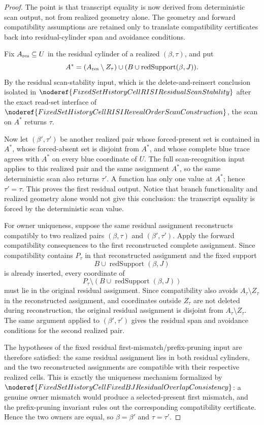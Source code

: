 \begin{proof}
The point is that transcript equality is now derived from deterministic scan
output, not from realized geometry alone.  The geometry and forward
compatibility assumptions are retained only to translate compatibility
certificates back into residual-cylinder span and avoidance conditions.

Fix \(A_{\rm res}\subseteq U\) in the residual cylinder of a realized
\((\beta,\tau)\), and put
\[
A^\ast=(A_{\rm res}\setminus Z_\tau)\cup
  (B\cup\operatorname{redSupport}(\beta,J)).
\]
By the residual scan-stability input, which is the delete-and-reinsert
conclusion isolated in
\(\noderef{FixedSetHistoryCellRISIResidualScanStability}\) after the exact
read-set interface of
\(\noderef{FixedSetHistoryCellRISIRevealOrderScanConstruction}\), the scan
on \(A^\ast\) returns \(\tau\).

Now let \((\beta',\tau')\) be another realized pair whose forced-present
set is contained in \(A^\ast\), whose forced-absent set is disjoint from
\(A^\ast\), and whose complete blue trace agrees with \(A^\ast\) on every
blue coordinate of \(U\).  The full scan-recognition input applies to this
realized pair and the same assignment \(A^\ast\), so the same deterministic
scan also returns \(\tau'\).  A function has only one value at \(A^\ast\); hence
\(\tau'=\tau\).  This proves the first residual output.  Notice that branch
functionality and realized geometry alone would not give this conclusion:
the transcript equality is forced by the deterministic scan value.

For owner uniqueness, suppose the same residual assignment reconstructs
compatibly to two realized pairs \((\beta,\tau)\) and
\((\beta',\tau')\).  Apply the forward compatibility consequences to the
first reconstructed complete assignment.  Since compatibility contains
\(P_\tau\) in that reconstructed assignment and the fixed support
\[
B\cup\operatorname{redSupport}(\beta,J)
\]
is already inserted, every coordinate of
\[
P_\tau\setminus(B\cup\operatorname{redSupport}(\beta,J))
\]
must lie in the original residual assignment.  Since compatibility also
avoids \(A_\tau\setminus Z_\tau\) in the reconstructed assignment, and
coordinates outside \(Z_\tau\) are not deleted during reconstruction, the
original residual assignment is disjoint from
\(A_\tau\setminus Z_\tau\).  The same argument applied to
\((\beta',\tau')\) gives the residual span and avoidance conditions for the
second realized pair.

The hypotheses of the fixed residual first-mismatch/prefix-pruning input are
therefore satisfied: the same residual assignment lies in both residual
cylinders, and the two reconstructed assignments are compatible with their
respective realized cells.  This is exactly the uniqueness mechanism
formalized by
\(\noderef{FixedSetHistoryCellFixedBJResidualOverlapConsistency}\): a genuine
owner mismatch would produce a selected-present first mismatch, and the
prefix-pruning invariant rules out the corresponding compatibility
certificate.  Hence the two owners are equal, so
\(\beta=\beta'\) and \(\tau=\tau'\).
\end{proof}
